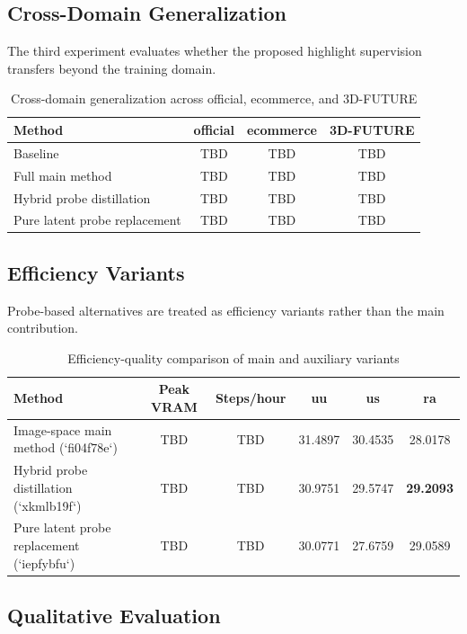 \documentclass[UTF8,a4paper]{ctexart}
\begin{document}
\subsection{Cross-Domain Generalization}

The third experiment evaluates whether the proposed highlight supervision transfers beyond the training domain.

\begin{table}[htbp]
\centering
\caption{Cross-domain generalization across official, ecommerce, and 3D-FUTURE}
\begin{tabular}{lccc}
\toprule
Method & official & ecommerce & 3D-FUTURE \\
\midrule
Baseline & TBD & TBD & TBD \\
Full main method & TBD & TBD & TBD \\
Hybrid probe distillation & TBD & TBD & TBD \\
Pure latent probe replacement & TBD & TBD & TBD \\
\bottomrule
\end{tabular}
\end{table}

\subsection{Efficiency Variants}

Probe-based alternatives are treated as efficiency variants rather than the main contribution.

\begin{table}[htbp]
\centering
\caption{Efficiency-quality comparison of main and auxiliary variants}
\begin{tabular}{lccccc}
\toprule
Method & Peak VRAM & Steps/hour & uu & us & ra \\
\midrule
Image-space main method (`fi04f78e`) & TBD & TBD & 31.4897 & 30.4535 & 28.0178 \\
Hybrid probe distillation (`xkmlb19f`) & TBD & TBD & 30.9751 & 29.5747 & \textbf{29.2093} \\
Pure latent probe replacement (`iepfybfu`) & TBD & TBD & 30.0771 & 27.6759 & 29.0589 \\
\bottomrule
\end{tabular}
\end{table}

\subsection{Qualitative Evaluation}
\end{document}
